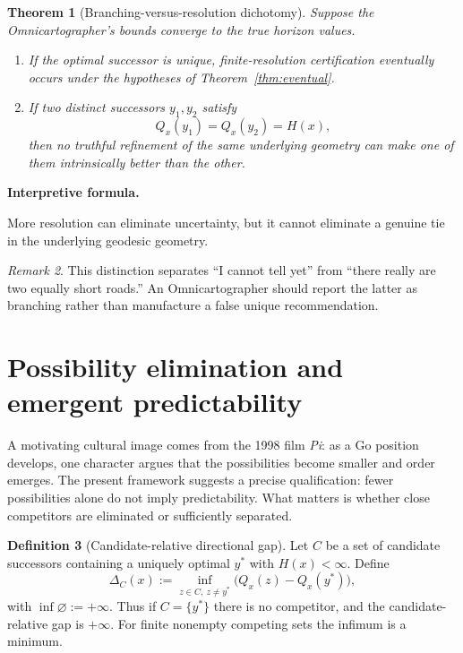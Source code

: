 \documentclass[11pt]{article}
\newtheorem{theorem}{Theorem}[section]
\theoremstyle{definition}
\newtheorem{definition}[theorem]{Definition}
\theoremstyle{remark}
\newtheorem{remark}[theorem]{Remark}
\newcommand{\Qval}{Q}
\newcommand{\Gap}{\Delta}
\newenvironment{interpretiveformula}{%
  \begin{center}\begin{minipage}{0.92\linewidth}\small
  \textbf{Interpretive formula.}\ \raggedright}{\end{minipage}\end{center}}
\begin{document}
\begin{theorem}[Branching-versus-resolution dichotomy]
Suppose the Omnicartographer's bounds converge to the true horizon values.
\begin{enumerate}[label=(\roman*)]
\item If the optimal successor is unique, finite-resolution certification eventually occurs under the hypotheses of Theorem~\ref{thm:eventual}.
\item If two distinct successors $y_1,y_2$ satisfy
\[
\Qval_x(y_1)=\Qval_x(y_2)=H(x),
\]
then no truthful refinement of the same underlying geometry can make one of them intrinsically better than the other.
\end{enumerate}
\end{theorem}

\begin{interpretiveformula}
More resolution can eliminate uncertainty, but it cannot eliminate a genuine tie in the underlying geodesic geometry.
\end{interpretiveformula}

\begin{remark}
This distinction separates ``I cannot tell yet'' from ``there really are two equally short roads.'' An Omnicartographer should report the latter as branching rather than manufacture a false unique recommendation.
\end{remark}

\section{Possibility elimination and emergent predictability}
A motivating cultural image comes from the 1998 film \emph{Pi}: as a Go position develops, one character argues that the possibilities become smaller and order emerges. The present framework suggests a precise qualification: fewer possibilities alone do not imply predictability. What matters is whether close competitors are eliminated or sufficiently separated.

\begin{definition}[Candidate-relative directional gap]
Let $C$ be a set of candidate successors containing a uniquely optimal $y^*$ with $H(x)<\infty$. Define
\[
\Gap_C(x):=\inf_{z\in C,\ z\neq y^*}\bigl(\Qval_x(z)-\Qval_x(y^*)\bigr),
\]
with $\inf\varnothing:=+\infty$. Thus if $C=\{y^*\}$ there is no competitor, and the candidate-relative gap is $+\infty$. For finite nonempty competing sets the infimum is a minimum.
\end{definition}
\end{document}
